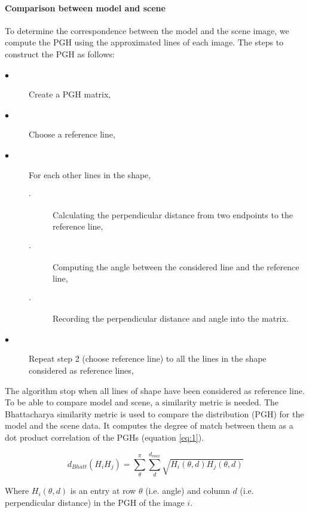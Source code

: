 \documentclass[twoside,twocolumn,10pt]{article}
\begin{document}
\paragraph{Comparison between model and scene}
To determine the correspondence between the model and the scene image,
we compute the PGH\cite{evans1993use} using the approximated lines of
each image. The steps to construct the PGH as follows:

{\small{
\begin{description}
\item[$\bullet$] Create a PGH matrix,
\item[$\bullet$] Choose a reference line,
\item[$\bullet$] For each other lines in the shape,
	\begin{description}
		\item[$\cdot$] Calculating the perpendicular distance from two endpoints to the reference line,
		\item[$\cdot$] Computing the angle between the considered line and the reference line,
		\item[$\cdot$] Recording the perpendicular distance and angle into the matrix.
	\end{description}
\item[$\bullet$] Repeat step 2 (choose reference line) to all the lines in the shape considered as reference lines,
\end{description}
}}
The algorithm stop when all lines of shape have been considered as reference
 line.
 \\
To be able to compare model and scene, a similarity metric
is needed. The Bhattacharya\cite{palaniswamy2010automatic} similarity
metric is used to compare the distribution (PGH) for the model and the
scene data. It computes the degree of match between them as a dot product correlation of the PGHs (equation \ref{eq:1}).
\begin{center}
\begin{equation} \label{eq:1}
d_{Bhatt} (H_{i}H_{j}) = \sum\limits_{\theta}^{\pi}\sum\limits_{d}^{d_{max}}\sqrt{H_{i}(\theta,d)H_{j}(\theta,d)}
\end{equation}
\end{center}
Where $H_{i}(\theta,d)$ is an entry at row $\theta$ (i.e. angle)  and
column $d$ (i.e. perpendicular distance) in the PGH of the image $i$.
 
\end{document}
